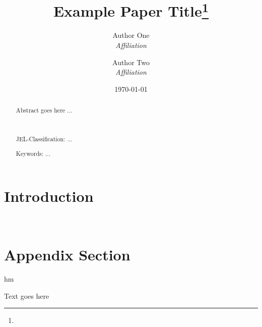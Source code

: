 \documentclass[12pt]{article}
\title{Example Paper Title\thanks{\acknlowledgements}}
\author{
  Author One\\ {\itshape\large Affiliation}
  \and 
  Author Two\\ {\itshape\large Affiliation}
}
\date{\today}
\begin{document}
\maketitle
\begin{abstract}
  Abstract goes here ...


  \par~\par\noindent
  {\color{asher}JEL-Classification:} ...
  \par\noindent
  {\color{asher}Keywords:} ...
  \par\vspace{-2.5mm}
\end{abstract}

\newpage



\section{Introduction}







\newpage~\appendix

\section{Appendix Section}

hm 

Text goes here
\end{document}
